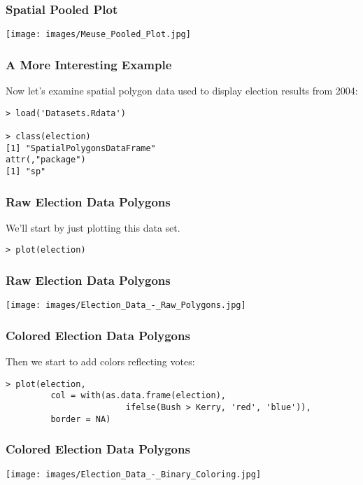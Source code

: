 \documentclass{beamer}
\begin{document}
\frame
{	
	\frametitle{Spatial Pooled Plot}
	
	\begin{center}
		\texttt{[image: images/Meuse\_Pooled\_Plot.jpg]}
	\end{center}
}

\begin{frame}[fragile]
	\frametitle{A More Interesting Example}

	Now let's examine spatial polygon data used to display election results from 2004:

	\begin{verbatim}
> load('Datasets.Rdata')

> class(election)
[1] "SpatialPolygonsDataFrame"
attr(,"package")
[1] "sp"
	\end{verbatim}
\end{frame}

\begin{frame}[fragile]
	\frametitle{Raw Election Data Polygons}
	
	We'll start by just plotting this data set.
	
	\begin{verbatim}
> plot(election)
	\end{verbatim}
\end{frame}

\frame
{	
	\frametitle{Raw Election Data Polygons}
	
	\begin{center}
		\texttt{[image: images/Election\_Data\_-\_Raw\_Polygons.jpg]}
	\end{center}
}

\begin{frame}[fragile]
	\frametitle{Colored Election Data Polygons}

	Then we start to add colors reflecting votes:
	
	\begin{verbatim}
> plot(election,
     	 col = with(as.data.frame(election),
	 	                ifelse(Bush > Kerry, 'red', 'blue')),
     	 border = NA)
	\end{verbatim}
\end{frame}

\frame
{	
	\frametitle{Colored Election Data Polygons}
	
	\begin{center}
		\texttt{[image: images/Election\_Data\_-\_Binary\_Coloring.jpg]}
	\end{center}
}
\end{document}
